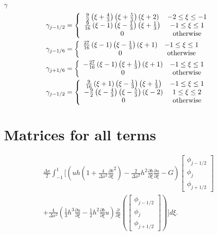 $\gamma$
\begin{align}
\gamma_{j-1/2} &= \left\lbrace \begin{array}{c c}
\frac{9}{2}\left(\xi + \frac{4}{3}\right)\left(\xi + \frac{5}{3}\right)\left(\xi + 2\right) & -2 \le \xi \le -1\\
\frac{9}{16}\left(\xi - 1\right)\left(\xi - \frac{1}{3}\right)\left(\xi  + \frac{1}{3}\right) & -1 \le \xi \le 1\\
0 & \text{otherwise} 
\end{array} \right. \\
\gamma_{j-1/6} &= \left\lbrace \begin{array}{c c}
\frac{27}{16}\left(\xi - 1\right)\left(\xi - \frac{1}{3}\right)\left(\xi + 1\right) & -1 \le \xi \le 1\\
0 & \text{otherwise} 
\end{array} \right. \\
\gamma_{j+1/6} &= \left\lbrace \begin{array}{c c}
-\frac{27}{16}\left(\xi - 1\right)\left(\xi + \frac{1}{3}\right)\left(\xi + 1\right) & -1 \le \xi \le 1\\
0 & \text{otherwise} 
\end{array} \right. \\
\gamma_{j-1/2} &= \left\lbrace \begin{array}{c c}
\frac{9}{16}\left(\xi + 1\right)\left(\xi - \frac{1}{3}\right)\left(\xi  + \frac{1}{3}\right) & -1 \le \xi \le 1\\
-\frac{9}{2}\left(\xi - \frac{4}{3}\right)\left(\xi - \frac{5}{3}\right)\left(\xi - 2\right) & 1 \le \xi \le 2\\
0 & \text{otherwise} 
\end{array} \right.
\end{align}


\section{Matrices for all terms}

\begin{multline*}
\frac{\Delta x}{2}\int_{-1 }^{1} \Bigg[  \left( uh \left(1 + \frac{4}{\Delta x^2}\frac{\partial b}{\partial \xi}^2 \right)  - \frac{2}{\Delta x^2} h^2 \frac{\partial b}{\partial \xi}  \frac{\partial u }{\partial \xi}  -  G \right) \begin{bmatrix}
\phi_{j-1/2}\\\phi_j \\\phi_{j+1/2}
\end{bmatrix}   \\ + \frac{4}{\Delta x^2} \left( \frac{1}{3}h^3 \frac{\partial {u}}{\partial \xi}    -     \frac{1}{2}h^2 \frac{\partial b}{\partial \xi} u    \right) \frac{\partial}{\partial \xi}\left(\begin{bmatrix}
\phi_{j-1/2}\\\phi_j \\\phi_{j+1/2}
\end{bmatrix} \right) \Bigg]d\xi.
\end{multline*}


